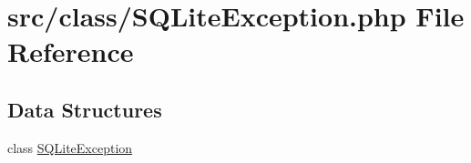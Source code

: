 \hypertarget{_s_q_lite_exception_8php}{}\section{src/class/\+S\+Q\+Lite\+Exception.php File Reference}
\label{_s_q_lite_exception_8php}
\subsection*{Data Structures}
\begin{DoxyCompactItemize}
\item 
class \hyperlink{class_s_q_lite_exception}{S\+Q\+Lite\+Exception}
\end{DoxyCompactItemize}
